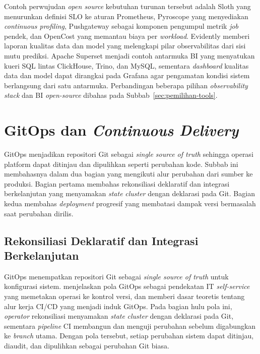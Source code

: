Contoh perwujudan \textit{open source} kebutuhan turunan tersebut adalah Sloth \autocite{sloth2025} yang menurunkan definisi SLO ke aturan Prometheus, Pyroscope \autocite{pyroscope2025} yang menyediakan \textit{continuous profiling}, Pushgateway \autocite{pushgateway2025} sebagai komponen pengumpul metrik \textit{job} pendek, dan OpenCost \autocite{opencost2025} yang memantau biaya per \textit{workload}. Evidently \autocite{evidently2025} memberi laporan kualitas data dan model yang melengkapi pilar observabilitas dari sisi mutu prediksi. Apache Superset \autocite{superset2025} menjadi contoh antarmuka BI yang menyatukan kueri SQL lintas ClickHouse, Trino, dan MySQL, sementara \textit{dashboard} kualitas data dan model dapat dirangkai pada Grafana agar pengamatan kondisi sistem berlangsung dari satu antarmuka. Perbandingan beberapa pilihan \textit{observability stack} dan BI \textit{open-source} dibahas pada Subbab~\ref{sec:pemilihan-tools}.



\section{GitOps dan \textit{Continuous Delivery}}
\label{sec:gitops}

GitOps menjadikan repositori Git sebagai \textit{single source of truth} sehingga operasi platform dapat ditinjau dan dipulihkan seperti perubahan kode. Subbab ini membahasnya dalam dua bagian yang mengikuti alur perubahan dari sumber ke produksi. Bagian pertama membahas rekonsiliasi deklaratif dan integrasi berkelanjutan yang menyamakan \textit{state} \textit{cluster} dengan deklarasi pada Git. Bagian kedua membahas \textit{deployment} progresif yang membatasi dampak versi bermasalah saat perubahan dirilis.

\subsection{Rekonsiliasi Deklaratif dan Integrasi Berkelanjutan}
\label{subsec:gitops-rekonsiliasi}

GitOps menempatkan repositori Git sebagai \textit{single source of truth} untuk konfigurasi sistem. \textcite{limoncelli2022gitops} menjelaskan pola GitOps sebagai pendekatan IT \textit{self-service} yang memetakan operasi ke kontrol versi, dan \textcite{devopshandbook2016} memberi dasar teoretis tentang alur kerja CI/CD yang menjadi induk GitOps. Pada bagian hulu pola ini, \textit{operator} rekonsiliasi menyamakan \textit{state} \textit{cluster} dengan deklarasi pada Git, sementara \textit{pipeline} CI membangun dan menguji perubahan sebelum digabungkan ke \textit{branch} utama. Dengan pola tersebut, setiap perubahan sistem dapat ditinjau, diaudit, dan dipulihkan sebagai perubahan Git biasa.

